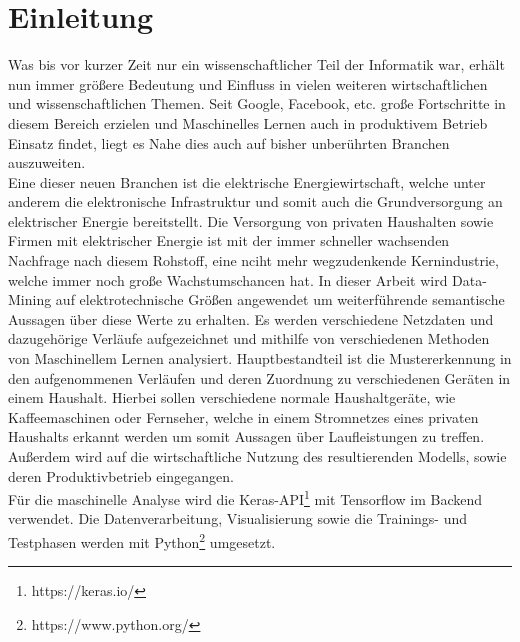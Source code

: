\chapter{Einleitung}

    Was bis vor kurzer Zeit nur ein wissenschaftlicher Teil der Informatik war, erhält nun immer größere Bedeutung und Einfluss in vielen weiteren wirtschaftlichen und wissenschaftlichen Themen. 
    Seit Google, Facebook, etc. große Fortschritte in diesem Bereich erzielen und Maschinelles Lernen auch in produktivem Betrieb Einsatz findet, liegt es Nahe dies auch auf bisher unberührten Branchen auszuweiten.\\
    \newline
    Eine dieser neuen Branchen ist die elektrische Energiewirtschaft, welche unter anderem die elektronische Infrastruktur und somit auch die Grundversorgung an elektrischer Energie bereitstellt.
    Die Versorgung von privaten Haushalten sowie Firmen mit elektrischer Energie ist mit der immer schneller wachsenden Nachfrage nach diesem Rohstoff, eine nciht mehr wegzudenkende Kernindustrie, welche immer noch große Wachstumschancen hat.
    In dieser Arbeit wird Data-Mining auf elektrotechnische Größen angewendet um weiterführende semantische Aussagen über diese Werte zu erhalten. 
    Es werden verschiedene Netzdaten und dazugehörige Verläufe aufgezeichnet und mithilfe von verschiedenen Methoden von Maschinellem Lernen analysiert.
    Hauptbestandteil ist die Mustererkennung in den aufgenommenen Verläufen und deren Zuordnung zu verschiedenen Geräten in einem Haushalt. 
    Hierbei sollen verschiedene normale Haushaltgeräte, wie Kaffeemaschinen oder Fernseher, welche in einem Stromnetzes eines privaten Haushalts erkannt werden um somit Aussagen über Laufleistungen zu treffen.
    Außerdem wird auf die wirtschaftliche Nutzung des resultierenden Modells, sowie deren Produktivbetrieb eingegangen.\\
    \newline
    Für die maschinelle Analyse wird die Keras-API\footnote{https://keras.io/} mit Tensorflow im Backend verwendet.
    Die Datenverarbeitung, Visualisierung sowie die Trainings- und Testphasen werden mit Python\footnote{https://www.python.org/} umgesetzt.
